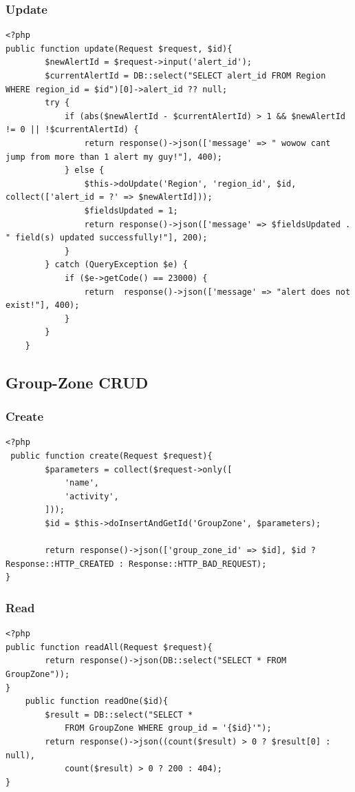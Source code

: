\subsubsection{Update}
\begin{verbatim}
<?php
public function update(Request $request, $id){
        $newAlertId = $request->input('alert_id');
        $currentAlertId = DB::select("SELECT alert_id FROM Region WHERE region_id = $id")[0]->alert_id ?? null;
        try {
            if (abs($newAlertId - $currentAlertId) > 1 && $newAlertId != 0 || !$currentAlertId) {
                return response()->json(['message' => " wowow cant jump from more than 1 alert my guy!"], 400);
            } else {
                $this->doUpdate('Region', 'region_id', $id, collect(['alert_id = ?' => $newAlertId]));
                $fieldsUpdated = 1;
                return response()->json(['message' => $fieldsUpdated . " field(s) updated successfully!"], 200);
            }
        } catch (QueryException $e) {
            if ($e->getCode() == 23000) {
                return  response()->json(['message' => "alert does not exist!"], 400);
            }
        }
    }
\end{verbatim}

\subsection{Group-Zone CRUD}
\subsubsection{Create}
\begin{verbatim}
<?php
 public function create(Request $request){
        $parameters = collect($request->only([
            'name',
            'activity',
        ]));
        $id = $this->doInsertAndGetId('GroupZone', $parameters);

        return response()->json(['group_zone_id' => $id], $id ? Response::HTTP_CREATED : Response::HTTP_BAD_REQUEST);
}
\end{verbatim}
\subsubsection{Read}
\begin{verbatim}
<?php
public function readAll(Request $request){
        return response()->json(DB::select("SELECT * FROM GroupZone"));
}
    public function readOne($id){
        $result = DB::select("SELECT *
            FROM GroupZone WHERE group_id = '{$id}'");
        return response()->json((count($result) > 0 ? $result[0] : null),
            count($result) > 0 ? 200 : 404);
}

\end{verbatim}
